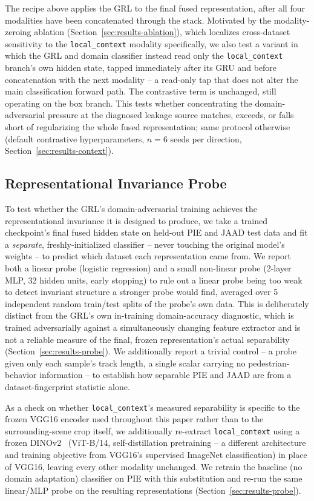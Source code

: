 The recipe above applies the GRL to the final fused representation,
after all four modalities have been concatenated through the stack.
Motivated by the modality-zeroing ablation (Section~\ref{sec:results-ablation}),
which localizes cross-dataset sensitivity to the \texttt{local\_context}
modality specifically, we also test a variant in which the GRL and
domain classifier instead read only the \texttt{local\_context}
branch's own hidden state, tapped immediately after its GRU and before
concatenation with the next modality -- a read-only tap that does not
alter the main classification forward path. The contrastive term is
unchanged, still operating on the box branch. This tests whether
concentrating the domain-adversarial pressure at the diagnosed leakage
source matches, exceeds, or falls short of regularizing the whole fused
representation; same protocol otherwise (default contrastive
hyperparameters, $n=6$ seeds per direction,
Section~\ref{sec:results-context}).

\subsection{Representational Invariance Probe}
\label{sec:method-probe}

To test whether the GRL's domain-adversarial training achieves the
representational invariance it is designed to produce, we take a
trained checkpoint's final fused hidden state on held-out PIE and JAAD
test data and fit a \emph{separate}, freshly-initialized classifier --
never touching the original model's weights -- to predict which dataset
each representation came from. We report both a linear probe (logistic
regression) and a small non-linear probe (2-layer MLP, 32 hidden units,
early stopping) to rule out a linear probe being too weak to detect
invariant structure a stronger probe would find, averaged over 5
independent random train/test splits of the probe's own data. This is
deliberately distinct from the GRL's own in-training domain-accuracy
diagnostic, which is trained adversarially against a simultaneously
changing feature extractor and is not a reliable measure of the final,
frozen representation's actual separability
(Section~\ref{sec:results-probe}). We additionally report a trivial
control -- a probe given only each sample's track length, a single
scalar carrying no pedestrian-behavior information -- to establish how
separable PIE and JAAD are from a dataset-fingerprint statistic alone.

As a check on whether \texttt{local\_context}'s measured separability
is specific to the frozen VGG16 encoder used throughout this paper
rather than to the surrounding-scene crop itself, we additionally
re-extract \texttt{local\_context} using a frozen
DINOv2~\cite{dinov2} (ViT-B/14, self-distillation pretraining --
a different architecture and training objective from VGG16's
supervised ImageNet classification) in place of VGG16, leaving every
other modality unchanged. We retrain the baseline (no domain
adaptation) classifier on PIE with this substitution and re-run the
same linear/MLP probe on the resulting representations
(Section~\ref{sec:results-probe}).

